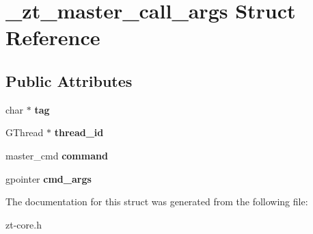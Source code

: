 \hypertarget{struct__zt__master__call__args}{\section{\-\_\-zt\-\_\-master\-\_\-call\-\_\-args Struct Reference}
\label{struct__zt__master__call__args}
}
\subsection*{Public Attributes}
\begin{DoxyCompactItemize}
\item 
\hypertarget{struct__zt__master__call__args_a2a0a971b09b6a90724938a464e57bfd0}{char $\ast$ {\bfseries tag}}\label{struct__zt__master__call__args_a2a0a971b09b6a90724938a464e57bfd0}

\item 
\hypertarget{struct__zt__master__call__args_a9c7ca1c242fd67a6b8fc858443a9f937}{G\-Thread $\ast$ {\bfseries thread\-\_\-id}}\label{struct__zt__master__call__args_a9c7ca1c242fd67a6b8fc858443a9f937}

\item 
\hypertarget{struct__zt__master__call__args_aac5454988a36c2fb70f61b8939011d18}{master\-\_\-cmd {\bfseries command}}\label{struct__zt__master__call__args_aac5454988a36c2fb70f61b8939011d18}

\item 
\hypertarget{struct__zt__master__call__args_aebaf3dd9c110a639d2c5fc1c02d4c083}{gpointer {\bfseries cmd\-\_\-args}}\label{struct__zt__master__call__args_aebaf3dd9c110a639d2c5fc1c02d4c083}

\end{DoxyCompactItemize}


The documentation for this struct was generated from the following file\-:\begin{DoxyCompactItemize}
\item 
zt-\/core.\-h\end{DoxyCompactItemize}

